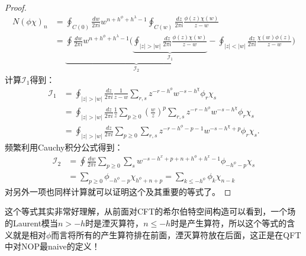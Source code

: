 \begin{proof}
	\begin{equation}
		\begin{aligned}N\left(\phi\chi\right)_n&=\oint_{C(0)}\frac{dw}{2\pi i}w^{n+h^\phi+h^{\lambda}-1}\oint_{C(w)}\frac{dz}{2\pi i}\frac{\phi(z)\chi(w)}{z-w}\\&=\underbrace{\oint\frac{dw}{2\pi i}w^{n+h^\phi+h^{\lambda}-1}\Big(\underbrace{\oint_{|z|>|w|}\frac{dz}{2\pi i}\frac{\phi(z)\chi(w)}{z-w}}_{\mathcal{I}_1}}_{\mathcal{I}_2}-\oint_{|z|<|w|}\frac{dz}{2\pi i}\frac{\chi(w)\phi(z)}{z-w}\Big)\end{aligned}
	\end{equation}
	计算$\mathcal{I}_1$得到：
	\begin{equation}
		\begin{aligned}
			\mathcal{I}_{1}& =\oint_{|z|>|w|}\frac{dz}{2\pi i}\frac{1}{z-w}\sum_{r,s}z^{-r-h^{\phi}}w^{-s-h^{\chi}}\phi_{r}\chi_{s}  \\
			&=\oint_{|z|>|w|}\frac{dz}{2\pi i}\left.\frac1z\sum_{p\geq0}\left(\frac wz\right)^p\sum_{r,s}z^{-r-h^\phi}w^{-s-h^\chi}\phi_r\chi_s\right.  \\
			&=\oint_{|z|>|w|}\frac{dz}{2\pi i}\sum_{p\geq0}\sum_{r,s}z^{-r-h^\phi-p-1}w^{-s-h^\chi+p}\phi_r\chi_s.
		\end{aligned}
	\end{equation}
	频繁利用Cauchy积分公式得到：
	\begin{equation}
		\begin{aligned}
			\mathcal{I}_2&=\oint\frac{dw}{2\pi i}\sum_{p\geq0}\sum_sw^{-s-h^x+p+n+h^\phi+h^x-1}\phi_{-h^\phi-p}\chi_s\\
			&=\sum_{p\geq0}\phi_{-h^\phi-p}\chi_{h^\phi+n+p}=\sum_{k\leq-h^\phi}\phi_k\chi_{n-k}
		\end{aligned}
	\end{equation}
	对另外一项也同样计算就可以证明这个及其重要的等式了。
\end{proof}
这个等式其实非常好理解，从前面对CFT的希尔伯特空间构造可以看到，一个场的Laurent模当$n>-h$时是湮灭算符，$n\leq-h$时是产生算符，所以这个等式的含义就是相对$\phi$而言将所有的产生算符排在前面，湮灭算符放在后面，这正是在QFT中对NOP最naive的定义！

